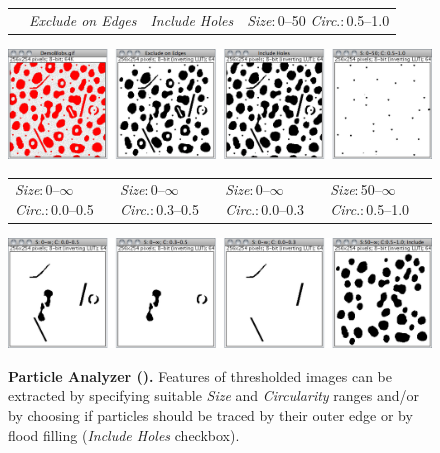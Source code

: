 \begin{figure}[h]
\setlength{\tabcolsep}{0pt}%
\begin{tabular}{>{\centering}p{}>{\centering}p{}>{\centering}p{}>{\centering}p{}}
\noindent \centering{}{\scriptsize \hspace{-6pt}Original\ (thresholded)} & \noindent \centering{}\emph{\scriptsize Exclude on Edges} & \noindent \centering{}\emph{\scriptsize Include Holes} & \noindent \centering{}\emph{\scriptsize Size}{\scriptsize :\,0--50
}\emph{\scriptsize Circ}{\scriptsize .:\,0.5--1.0}\tabularnewline
\end{tabular}

{\footnotesize \includegraphics[width=1\columnwidth]{images/AnalyzeParticlesDemo-1}}{\footnotesize \par}

\setlength{\tabcolsep}{0pt}%
\begin{tabular}{>{\centering}p{}>{\centering}p{}>{\centering}p{}>{\centering}p{}}
\noindent \centering{}\emph{\scriptsize Size}{\scriptsize :\,0--$\infty$
}\emph{\scriptsize Circ}{\scriptsize .:\,0.0--0.5} & \noindent \centering{}\emph{\scriptsize Size}{\scriptsize :\,0--$\infty$
}\emph{\scriptsize Circ}{\scriptsize .:\,0.3--0.5} & \noindent \centering{}\emph{\scriptsize Size}{\scriptsize :\,0--$\infty$
}\emph{\scriptsize Circ}{\scriptsize .:\,0.0--0.3} & \noindent \centering{}\emph{\scriptsize Size}{\scriptsize :\,50--$\infty$
}\emph{\scriptsize Circ}{\scriptsize .:\,0.5--1.0}\tabularnewline
\end{tabular}

{\footnotesize \includegraphics[width=1\columnwidth]{images/AnalyzeParticlesDemo-2}}\caption[Particle Analyzer]{\textbf{\label{fig:ParticleAnalyzer}Particle Analyzer (\protect{}).
}Features of thresholded images can be extracted by specifying suitable
\emph{Size} and \emph{Circularity} ranges and/or by choosing if particles
should be traced by their outer edge or by flood filling (\emph{Include
Holes} checkbox).}
\end{figure}

